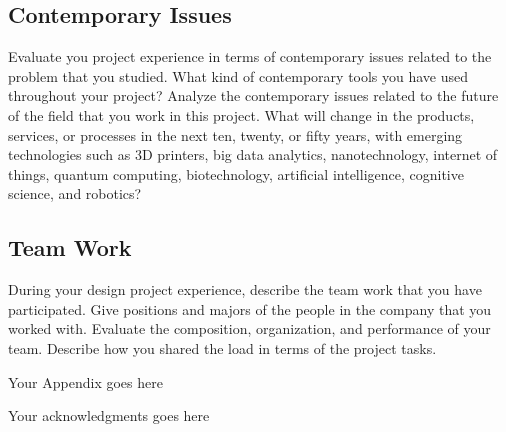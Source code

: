 \documentclass{mefsdp}
\begin{document}
	\subsection{Contemporary Issues}
	Evaluate you project experience in terms of contemporary issues related to the problem that you studied. What kind of contemporary tools you have used throughout your project? Analyze the contemporary issues related to the future of the field that you work in this project. What will change in the products, services, or processes in the next ten, twenty, or fifty years, with emerging technologies such as 3D printers, big data analytics, nanotechnology, internet of things, quantum computing, biotechnology, artificial intelligence, cognitive science, and robotics?
	
	\subsection{Team Work}
	During your design project experience, describe the team work that you have participated. Give positions and majors of the people in the company that you worked with. Evaluate the composition, organization, and performance of your team. Describe how you shared the load in terms of the project tasks. 
	
	\begin{appendix}[A]
	\end{appendix}

	\begin{appendix}[B]
		Your Appendix goes here
	\end{appendix}
	
	\begin{acknowledgments}
		Your acknowledgments goes here
	\end{acknowledgments}
	
	
	
\end{document}
